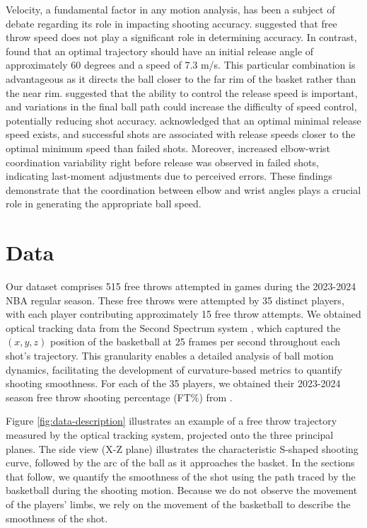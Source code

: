 \documentclass[Review,sageh,times,doublespace]{sagej}
\begin{document}
      Velocity, a fundamental factor in any motion analysis, has been a subject of debate regarding its role in impacting shooting accuracy. \citet{pakosz_muscle_2021} suggested that free throw speed does not play a significant role in determining accuracy. In contrast, \citet{hamilton_optimal_1997} found that an optimal trajectory should have an initial release angle of approximately 60 degrees and a speed of 7.3 m/s. This particular combination is advantageous as it directs the ball closer to the far rim of the basket rather than the near rim. \citet{slegers_role_2024} suggested that the ability to control the release speed is important, and variations in the final ball path could increase the difficulty of speed control, potentially reducing shot accuracy. \citet{mullineaux_coordination-variability_2010} acknowledged that an optimal minimal release speed exists, and successful shots are associated with release speeds closer to the optimal minimum speed than failed shots. Moreover, increased elbow-wrist coordination variability right before release was observed in failed shots, indicating last-moment adjustments due to perceived errors. These findings demonstrate that the coordination between elbow and wrist angles plays a crucial role in generating the appropriate ball speed.
      
  \section{Data}

    Our dataset comprises 515 free throws attempted in games during the 2023-2024 NBA regular season. These free throws were attempted by 35 distinct players, with each player contributing approximately 15 free throw attempts. We obtained optical tracking data from the Second Spectrum system \citep{national_basketball_association_nba_2016}, which captured the $(x, y, z)$ position of the basketball at 25 frames per second throughout each shot's trajectory. This granularity enables a detailed analysis of ball motion dynamics, facilitating the development of curvature-based metrics to quantify shooting smoothness. For each of the 35 players, we obtained their 2023-2024 season free throw shooting percentage (FT\%) from \citet{basketball_reference_2023-24_2024}.

    Figure \ref{fig:data-description} illustrates an example of a free throw trajectory measured by the optical tracking system, projected onto the three principal planes. The side view (X-Z plane) illustrates the characteristic S-shaped shooting curve, followed by the arc of the ball as it approaches the basket. In the sections that follow, we quantify the smoothness of the shot using the path traced by the basketball during the shooting motion. Because we do not observe the movement of the players' limbs, we rely on the movement of the basketball to describe the smoothness of the shot.
\end{document}
